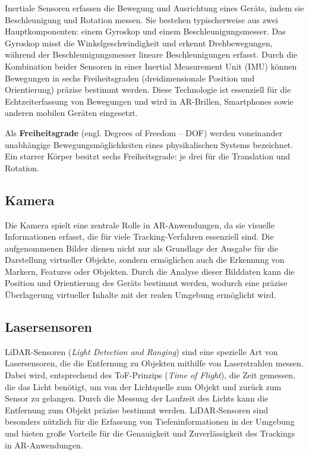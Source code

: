 Inertiale Sensoren erfassen die Bewegung und Ausrichtung eines Geräts, indem sie Beschleunigung und Rotation messen. Sie bestehen typischerweise aus zwei Hauptkomponenten: einem Gyroskop und einem Beschleunigungsmesser. Das Gyroskop misst die Winkelgeschwindigkeit und erkennt Drehbewegungen, während der Beschleunigungsmesser lineare Beschleunigungen erfasst. Durch die Kombination beider Sensoren in einer Inertial Measurement Unit (IMU) können Bewegungen in sechs Freiheitsgraden (dreidimensionale Position und Orientierung) präzise bestimmt werden. Diese Technologie ist essenziell für die Echtzeiterfassung von Bewegungen und wird in AR-Brillen, Smartphones sowie anderen mobilen Geräten eingesetzt. \cite{doerner2022virtual}

\begin{tcolorbox}[colback=THAi-Blue!20!white, colframe=THAi-Blue]
    Als \textbf{Freiheitsgrade} (engl. Degrees of Freedom – DOF) werden voneinander unabhängige Bewegungsmöglichkeiten eines physikalischen Systems bezeichnet. Ein starrer Körper besitzt sechs Freiheitsgrade: je drei für die Translation und Rotation. \cite{wikipedia2024dof}
\end{tcolorbox}  

\subsection{Kamera}

Die Kamera spielt eine zentrale Rolle in AR-Anwendungen, da sie visuelle Informationen erfasst, die für viele Tracking-Verfahren essenziell sind. Die aufgenommenen Bilder dienen nicht nur als Grundlage der Ausgabe für die Darstellung virtueller Objekte, sondern ermöglichen auch die Erkennung von Markern, Features oder Objekten. Durch die Analyse dieser Bilddaten kann die Position und Orientierung des Geräts bestimmt werden, wodurch eine präzise Überlagerung virtueller Inhalte mit der realen Umgebung ermöglicht wird. \cite{doerner2022virtual}

\subsection{Lasersensoren}\label{LiDAR}

LiDAR-Sensoren (\emph{Light Detection and Ranging}) sind eine spezielle Art von Lasersensoren, die die Entfernung zu Objekten mithilfe von Laserstrahlen messen. Dabei wird, entsprechend des ToF-Prinzips (\emph{Time of Flight}), die Zeit gemessen, die das Licht benötigt, um von der Lichtquelle zum Objekt und zurück zum Sensor zu gelangen. Durch die Messung der Laufzeit des Lichts kann die Entfernung zum Objekt präzise bestimmt werden. LiDAR-Sensoren sind besonders nützlich für die Erfassung von Tiefeninformationen in der Umgebung und bieten große Vorteile für die Genauigkeit und Zuverlässigkeit des Trackings in AR-Anwendungen. \cite{doerner2022virtual, ibm2024lidar}

